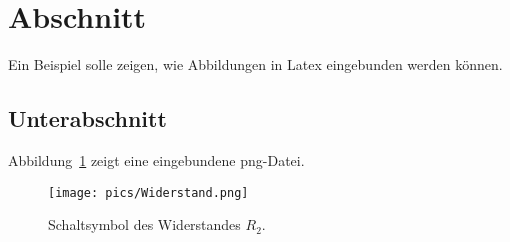 \section{Abschnitt}
Ein Beispiel solle zeigen, wie Abbildungen in Latex eingebunden werden können.  

\subsection{Unterabschnitt}

Abbildung~\ref{abbWiderstand} zeigt eine eingebundene png-Datei.

\begin{figure}[h]
\centering
\texttt{[image: pics/Widerstand.png]}
\caption{Schaltsymbol des Widerstandes $R_2$.}
	\label{abbWiderstand}
\end{figure}
